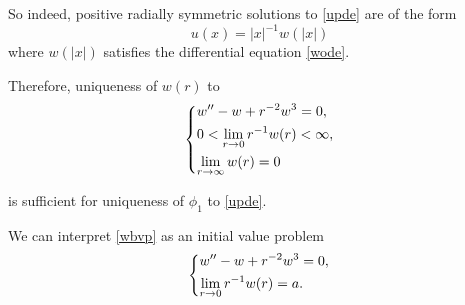 \documentclass{article}
\newcommand{\be}{\begin{equation}}
\newcommand{\ee}{\end{equation}}
\numberwithin{equation}{section}
\begin{document}
So indeed, positive radially symmetric solutions to \eqref{upde} are of the form 
$$ u(x) = |x|^{-1} w(|x|) $$
where $w(|x|)$ satisfies the differential equation \eqref{wode}.

Therefore, uniqueness of $w(r)$ to
\be \begin{dcases} \label{wbvp}
    w'' - w + r^{-2}w^3 = 0,\\
    0 < \lim_{r\to 0}r^{-1}w(r) < \infty,\\
    \lim_{r\to\infty}w(r) = 0
\end{dcases} \ee

is sufficient for uniqueness of $\phi_1$ to \eqref{upde}.

We can interpret \eqref{wbvp} as an initial value problem
\be \begin{dcases} \label{wivp}
    w'' - w + r^{-2}w^3 = 0,\\
    \lim_{r\to 0}r^{-1}w(r) = a.
\end{dcases} \ee

\end{document}
